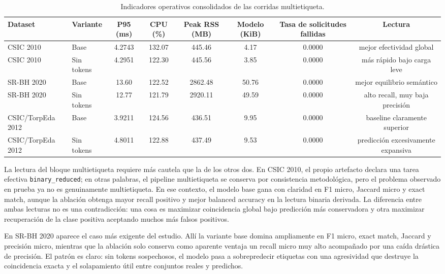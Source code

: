 \documentclass[12pt,oneside]{report}
\begin{document}
\begin{table}[H]
\centering
\caption{Indicadores operativos consolidados de las corridas multietiqueta.}
\label{tab:res-ml-op}
\scriptsize
\renewcommand{\arraystretch}{1.12}
\begin{adjustbox}{max width=\textwidth}
\begin{tabular}{llcccccc}
\toprule
\textbf{Dataset} & \textbf{Variante} & \textbf{P95} (ms) & \textbf{CPU} (\%) & \textbf{Peak RSS} (MB) & \textbf{Modelo} (KiB) & \textbf{Tasa de solicitudes fallidas} & \textbf{Lectura} \\
\midrule
CSIC 2010 & Base & 4.2743 & 132.07 & 445.46 & 4.17 & 0.0000 & mejor efectividad global \\CSIC 2010 & Sin tokens & 4.2951 & 122.30 & 445.56 & 3.85 & 0.0000 & más rápido bajo carga leve \\SR-BH 2020 & Base & 13.60 & 122.52 & 2862.48 & 50.76 & 0.0000 & mejor equilibrio semántico \\SR-BH 2020 & Sin tokens & 12.77 & 121.79 & 2920.11 & 49.59 & 0.0000 & alto recall, muy baja precisión \\CSIC/TorpEda 2012 & Base & 3.9211 & 124.56 & 436.51 & 9.95 & 0.0000 & baseline claramente superior \\CSIC/TorpEda 2012 & Sin tokens & 4.8011 & 122.88 & 437.49 & 9.53 & 0.0000 & predicción excesivamente expansiva \\\bottomrule
\end{tabular}
\end{adjustbox}
\end{table}

La lectura del bloque multietiqueta requiere más cautela que la de los otros dos. En CSIC 2010, el propio artefacto declara una tarea efectiva \texttt{binary\_reduced}; en otras palabras, el pipeline multietiqueta se conserva por consistencia metodológica, pero el problema observado en prueba ya no es genuinamente multietiqueta. En ese contexto, el modelo base gana con claridad en F1 micro, Jaccard micro y exact match, aunque la ablación obtenga mayor recall positivo y mejor balanced accuracy en la lectura binaria derivada. La diferencia entre ambas lecturas no es una contradicción: una cosa es maximizar coincidencia global bajo predicción más conservadora y otra maximizar recuperación de la clase positiva aceptando muchos más falsos positivos.\

En SR-BH 2020 aparece el caso más exigente del estudio. Allí la variante base domina ampliamente en F1 micro, exact match, Jaccard y precisión micro, mientras que la ablación solo conserva como aparente ventaja un recall micro muy alto acompañado por una caída drástica de precisión. El patrón es claro: sin tokens sospechosos, el modelo pasa a sobrepredecir etiquetas con una agresividad que destruye la coincidencia exacta y el solapamiento útil entre conjuntos reales y predichos.\
\end{document}
